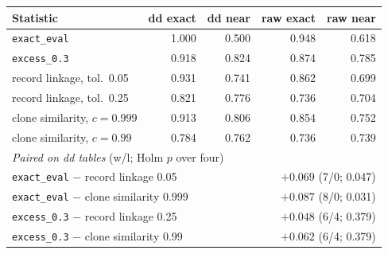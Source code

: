 \begin{tabular}{lrrrr}
\toprule
Statistic & dd exact & dd near & raw exact & raw near\\
\midrule
\texttt{exact\_eval} & 1.000 & 0.500 & 0.948 & 0.618\\
\texttt{excess\_0.3} & 0.918 & 0.824 & 0.874 & 0.785\\
record linkage, tol.\ 0.05 & 0.931 & 0.741 & 0.862 & 0.699\\
record linkage, tol.\ 0.25 & 0.821 & 0.776 & 0.736 & 0.704\\
clone similarity, $c=0.999$ & 0.913 & 0.806 & 0.854 & 0.752\\
clone similarity, $c=0.99$ & 0.784 & 0.762 & 0.736 & 0.739\\
\midrule
\multicolumn{5}{l}{\emph{Paired on dd tables} (w/l; Holm $p$ over four)}\\
\multicolumn{3}{l}{\texttt{exact\_eval} $-$ record linkage 0.05} & \multicolumn{2}{r}{$+0.069$ (7/0; 0.047)}\\
\multicolumn{3}{l}{\texttt{exact\_eval} $-$ clone similarity 0.999} & \multicolumn{2}{r}{$+0.087$ (8/0; 0.031)}\\
\multicolumn{3}{l}{\texttt{excess\_0.3} $-$ record linkage 0.25} & \multicolumn{2}{r}{$+0.048$ (6/4; 0.379)}\\
\multicolumn{3}{l}{\texttt{excess\_0.3} $-$ clone similarity 0.99} & \multicolumn{2}{r}{$+0.062$ (6/4; 0.379)}\\
\bottomrule
\end{tabular}
